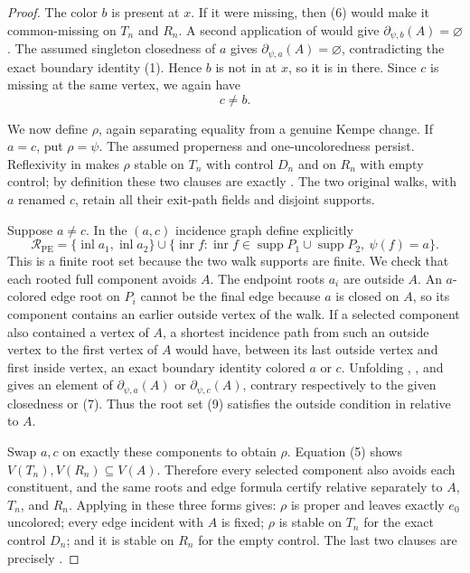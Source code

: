 \begin{proof}
The color $b$ is present at $x$.  If it were missing, then (6) would make
it common-missing on $T_n$ and $R_n$.  A second application of
 would give
$\partial_{\psi,b}(A)=\varnothing$.  The assumed singleton closedness of
$a$ gives $\partial_{\psi,a}(A)=\varnothing$, contradicting the exact
boundary identity (1).  Hence $b$ is not in
 at $x$, so it is in
 there.  Since $c$ is missing at the same vertex,
we again have
\[
                         c\ne b.                    \tag{8}
\]

We now define $\rho$, again separating equality from a genuine Kempe
change.  If $a=c$, put $\rho=\psi$.  The assumed properness and
one-uncoloredness persist.  Reflexivity in  makes $\rho$
stable on $T_n$ with control $D_n$ and on $R_n$ with empty control;
by definition these two clauses are exactly
.  The two original walks, with $a$
renamed $c$, retain all their exit-path fields and disjoint supports.

Suppose $a\ne c$.  In the $(a,c)$ incidence graph define explicitly
\[
 \mathcal R_{\mathrm{PE}}=
 \{\operatorname{inl}a_1,\operatorname{inl}a_2\}
 \mathbin\cup
 \{\operatorname{inr}f: \operatorname{inr}f\in
       \operatorname{supp}P_1\cup\operatorname{supp}P_2,
       \ \psi(f)=a\}.                               \tag{9}
\]
This is a finite root set because the two walk supports are finite.  We
check that each rooted full component avoids $A$.  The endpoint roots
$a_i$ are outside $A$.
An $a$-colored edge root on $P_i$ cannot be the final edge because $a$ is
closed on $A$, so its component contains an earlier outside vertex of
the walk.  If a selected component also contained a vertex of $A$, a
shortest incidence path from such an outside vertex to the first vertex
of $A$ would have, between its last outside vertex and first inside
vertex, an exact boundary identity colored $a$ or $c$.  Unfolding
, , and
 gives an element of
$\partial_{\psi,a}(A)$ or $\partial_{\psi,c}(A)$, contrary respectively
to the given closedness or (7).  Thus the root set (9) satisfies the outside
condition in  relative to $A$.

Swap $a,c$ on exactly these components to obtain $\rho$.  Equation (5)
shows $V(T_n),V(R_n)\subseteq V(A)$.  Therefore every selected component
also avoids each constituent, and the same roots and edge formula certify
 relative separately to $A$, $T_n$, and
$R_n$.  Applying  in these three
forms gives: $\rho$ is proper and leaves exactly $e_0$ uncolored; every
edge incident with $A$ is fixed; $\rho$ is stable on $T_n$ for the exact
control $D_n$; and it is stable on $R_n$ for the empty control.  The
last two clauses are precisely .


\end{proof}
